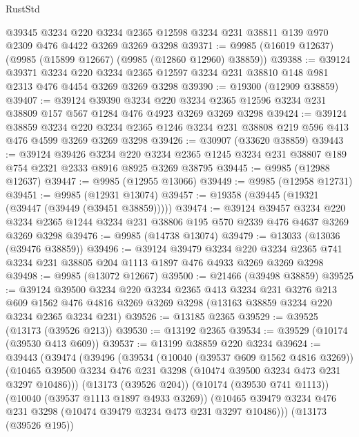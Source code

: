 \begin{lexlean}{RustStd}
\begin{coremodule}
    @39345
    @3234
    @220
    @3234
    @2365
    @12598
    @3234
    @231
    @38811
    @139
    @970
    @2309
    @476
    @4422
    @3269
    @3269
    @3298
@39371 := @9985 (@16019 @12637) (@9985 (@15899 @12667) (@9985 (@12860 @12960) @38859))
@39388 := @39124
    @39371
    @3234
    @220
    @3234
    @2365
    @12597
    @3234
    @231
    @38810
    @148
    @981
    @2313
    @476
    @4454
    @3269
    @3269
    @3298
@39390 := @19300 (@12909 @38859)
@39407 := @39124
    @39390
    @3234
    @220
    @3234
    @2365
    @12596
    @3234
    @231
    @38809
    @157
    @567
    @1284
    @476
    @4923
    @3269
    @3269
    @3298
@39424 := @39124
    @38859
    @3234
    @220
    @3234
    @2365
    @1246
    @3234
    @231
    @38808
    @219
    @596
    @413
    @476
    @4599
    @3269
    @3269
    @3298
@39426 := @30907 (@33620 @38859)
@39443 := @39124
    @39426
    @3234
    @220
    @3234
    @2365
    @1245
    @3234
    @231
    @38807
    @189
    @754
    @2321
    @2333
    @8916
    @8925
    @3269
    @38795
@39445 := @9985 (@12988 @12637)
@39447 := @9985 (@12955 @13066)
@39449 := @9985 (@12958 @12731)
@39451 := @9985 (@12931 @13074)
@39457 := @19358 (@39445 (@19321 (@39447 (@39449 (@39451 @38859)))))
@39474 := @39124
    @39457
    @3234
    @220
    @3234
    @2365
    @1244
    @3234
    @231
    @38806
    @195
    @570
    @2339
    @476
    @4637
    @3269
    @3269
    @3298
@39476 := @9985 (@14738 @13074)
@39479 := @13033 (@13036 (@39476 @38859))
@39496 := @39124
    @39479
    @3234
    @220
    @3234
    @2365
    @741
    @3234
    @231
    @38805
    @204
    @1113
    @1897
    @476
    @4933
    @3269
    @3269
    @3298
@39498 := @9985 (@13072 @12667)
@39500 := @21466 (@39498 @38859)
@39525 := @39124
    @39500
    @3234
    @220
    @3234
    @2365
    @413
    @3234
    @231
    @3276
    @213
    @609
    @1562
    @476
    @4816
    @3269
    @3269
    @3298
    (@13163 @38859 @3234 @220 @3234 @2365 @3234 @231)
@39526 := @13185 @2365
@39529 := @39525 (@13173 (@39526 @213))
@39530 := @13192 @2365
@39534 := @39529 (@10174 (@39530 @413 @609))
@39537 := @13199 @38859 @220 @3234
@39624 := @39443
    (@39474
      (@39496
        (@39534
          (@10040 (@39537 @609 @1562 @4816 @3269))
          (@10465 @39500 @3234 @476 @231 @3298 (@10474 @39500 @3234 @473 @231 @3297 @10486)))
        (@13173 (@39526 @204))
        (@10174 (@39530 @741 @1113))
        (@10040 (@39537 @1113 @1897 @4933 @3269))
        (@10465 @39479 @3234 @476 @231 @3298 (@10474 @39479 @3234 @473 @231 @3297 @10486)))
      (@13173 (@39526 @195))

\end{coremodule}
\end{lexlean}
